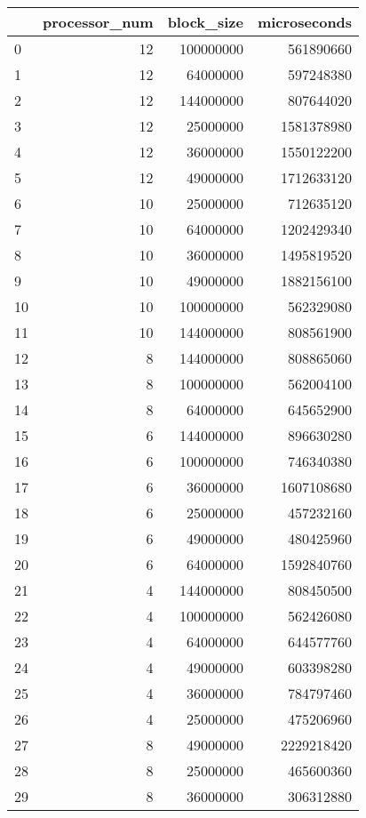 \begin{tabular}{lrrr}
\toprule
{} &  processor\_num &  block\_size &  microseconds \\
\midrule
0  &             12 &   100000000 &     561890660 \\
1  &             12 &    64000000 &     597248380 \\
2  &             12 &   144000000 &     807644020 \\
3  &             12 &    25000000 &    1581378980 \\
4  &             12 &    36000000 &    1550122200 \\
5  &             12 &    49000000 &    1712633120 \\
6  &             10 &    25000000 &     712635120 \\
7  &             10 &    64000000 &    1202429340 \\
8  &             10 &    36000000 &    1495819520 \\
9  &             10 &    49000000 &    1882156100 \\
10 &             10 &   100000000 &     562329080 \\
11 &             10 &   144000000 &     808561900 \\
12 &              8 &   144000000 &     808865060 \\
13 &              8 &   100000000 &     562004100 \\
14 &              8 &    64000000 &     645652900 \\
15 &              6 &   144000000 &     896630280 \\
16 &              6 &   100000000 &     746340380 \\
17 &              6 &    36000000 &    1607108680 \\
18 &              6 &    25000000 &     457232160 \\
19 &              6 &    49000000 &     480425960 \\
20 &              6 &    64000000 &    1592840760 \\
21 &              4 &   144000000 &     808450500 \\
22 &              4 &   100000000 &     562426080 \\
23 &              4 &    64000000 &     644577760 \\
24 &              4 &    49000000 &     603398280 \\
25 &              4 &    36000000 &     784797460 \\
26 &              4 &    25000000 &     475206960 \\
27 &              8 &    49000000 &    2229218420 \\
28 &              8 &    25000000 &     465600360 \\
29 &              8 &    36000000 &     306312880 \\
\bottomrule
\end{tabular}

